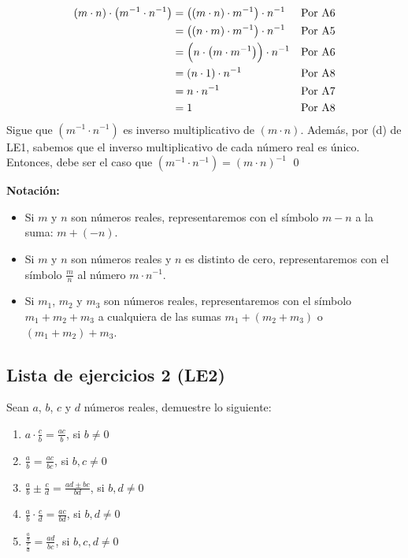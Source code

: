\documentclass[11pt]{article}
\begin{document}
\begin{enumerate}[label=\alph*)]
\begin{align*}
        \left(m \cdot n \right) \cdot  \left(m^{-1} \cdot n^{-1}  \right)	&=	 \left( \left(m \cdot n \right) \cdot m^{-1}  \right) \cdot n^{-1}  	&& \text{Por A6}\\
    &=	 \left( \left(n \cdot m \right) \cdot m^{-1}  \right) \cdot n^{-1}  	&& \text{Por A5}\\
    &=	 \Bigl(n \cdot  \left(m \cdot m^{-1}\right) \Bigr) \cdot n^{-1}	&& \text{Por A6}\\
    &=	 \left(n \cdot 1 \right) \cdot n^{-1}	&& \text{Por A8}\\
    &=	n \cdot n^{-1}	&& \text{Por A7}\\
    &=	1	&& \text{Por A8}
    \end{align*}
    Sigue que $\left(m^{-1} \cdot n^{-1} \right)$ es inverso multiplicativo de $\left( m \cdot n \right)$. Además, por (d) de LE1, sabemos que el inverso multiplicativo de cada número real es único. Entonces, debe ser el caso que $\left(m^{-1} \cdot n^{-1} \right) = \left( m \cdot n \right)^{-1}$ \qed
\end{enumerate}

\textbf{Notación:}

\begin{itemize}
    \item Si $m$ y $n$ son números reales, representaremos con el símbolo $m-n$ a la suma: $m+ (-n)$.
    \item Si $m$ y $n$ son números reales y $n$ es distinto de cero, representaremos con el símbolo $ \frac{m}{n}$ al número $m \cdot n^{-1} $.
    \item Si $m_1$, $m_2$ y $m_3$ son números reales, representaremos con el símbolo $m_1+m_2+ m_3$ a cualquiera de las sumas $m_1+ \left(m_2+ m_3 \right)$ o $\left(m_1+ m_2 \right)+ m_3$.
\end{itemize}

\subsection*{Lista de ejercicios 2 (LE2)}

Sean $a$, $b$, $c$ y $d$ números reales, demuestre lo siguiente:

\begin{enumerate}[label=\alph*)]
    \item $a \cdot \frac{c}{b} = \frac{ac}{b}$, si $b \neq 0$
    \item $\frac{a}{b} = \frac{ac}{bc}$, si $b,c \neq 0$
    \item $\frac{a}{b} \pm \frac{c}{d} = \frac{ad \pm bc}{bd} $, si $b, d \neq 0$
    \item $\frac{a}{b} \cdot \frac{c}{d} = \frac{ac}{bd}$, si $b, d \neq 0$
    \item $\frac{\frac{a}{b}}{\frac{c}{d}} = \frac{ad}{bc}$, si $b, c, d \neq 0$
\end{enumerate}
\end{document}
